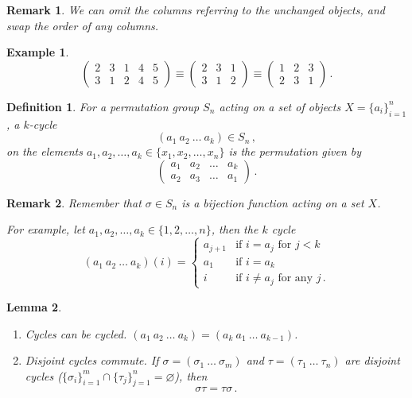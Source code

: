 \documentclass{article}
\theoremstyle{plain}\theoremheaderfont{\normalfont\itshape}\theorembodyfont{\rmfamily}\theoremseparator{.}\newtheorem*{rem}{Remark}\newtheorem*{ex}{Example}\newtheorem*{proof}{Proof}\newtheorem*{altp}{Alternative proof}
\theoremstyle{plain}\theoremheaderfont{\normalfont\bfseries}\theorembodyfont{\rmfamily}\theoremseparator{.}\newtheorem{thm}{Theorem}[section]\newtheorem{lem}[thm]{Lemma}\newtheorem{prop}[thm]{Proposition}\newtheorem*{cor}{Corollary}\newtheorem{defn}[thm]{Definition}\newtheorem{clm}[thm]{Claim}\newtheorem{clminproof}{Claim}
\theoremstyle{break}\theoremheaderfont{\normalfont\itshape}\theorembodyfont{\rmfamily}\theoremseparator{.\medskip}\newtheorem*{proofskip}{Proof}\newtheorem*{exs}{Examples}\newtheorem*{rems}{Remarks}
\theoremstyle{break}\theoremheaderfont{\normalfont\bfseries}\theorembodyfont{\rmfamily}\theoremseparator{.\medskip}\newtheorem{lemskip}[thm]{Lemma}\newtheorem{defnskip}[thm]{Definition}\newtheorem{propskip}[thm]{Proposition}\newtheorem{thmskip}[thm]{Theorem}
\numberwithin{equation}{section}
\begin{document}
	\begin{rem}
		We can omit the columns referring to the unchanged objects, and swap the order of any columns.
	\end{rem}
	\begin{ex}
		\[\begin{pmatrix}
			2 & 3 & 1 & 4 & 5\\
			3 & 1 & 2 & 4 & 5
		\end{pmatrix}\equiv\begin{pmatrix}
			2 & 3 & 1\\
			3 & 1 & 2
		\end{pmatrix}\equiv\begin{pmatrix}
			1 & 2 & 3\\
			2 & 3 & 1
		\end{pmatrix}\,.\]
	\end{ex}
	\begin{defn}
		For a permutation group \(S_n\) acting on a set of objects \(X=\{a_i\}_{i=1}^{n}\), a \(k\)-cycle
		\[(a_1~a_2~\dots~a_k)\in S_n\,,\]
		on the elements \(a_1,a_2,\dots,a_k\in\{x_1,x_2,\dots,x_n\}\) is the permutation given by
		\[\begin{pmatrix}
			a_1 & a_2 & \dots & a_k\\
			a_2 & a_3 & \dots & a_1
		\end{pmatrix}\,.\]
	\end{defn}
	\begin{rem}
		Remember that \(\sigma\in S_n\) is a bijection function acting on a set \(X\).

		For example, let \(a_1,a_2,\dots,a_k\in\{1,2,\dots,n\}\), then the \(k\) cycle
		\[(a_1~a_2~\dots ~a_k)(i)=\begin{cases}
			a_{j+1} & \text{if }i=a_j\text{ for }j<k\\
			a_1 & \text{if }i=a_k\\
			i & \text{if }i\ne a_j \text{ for any } j\,.
		\end{cases}\]
	\end{rem}
	\begin{lemskip}
		\begin{enumerate}[topsep=0pt]
			\item Cycles can be cycled. \((a_1~a_2~\dots~a_k)=(a_k~a_1~\dots~a_{k-1})\).
			\item Disjoint cycles commute. If \(\sigma=(\sigma_1~\dots~\sigma_m)\) and \(\tau=(\tau_1~\dots~\tau_n)\) are disjoint cycles (\(\{\sigma_i\}_{i=1}^{m}\cap\{\tau_j\}_{j=1}^{n}=\varnothing\)), then
			\[\sigma\tau=\tau\sigma\,.\]
		\end{enumerate}
	\end{lemskip}
\end{document}
